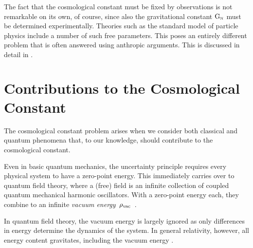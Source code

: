 The fact that the cosmological constant must be fixed by observations is not remarkable on its own, of course, since also the gravitational constant \(\mathrm{G}_\textnormal{\tiny{N}}\) must be determined experimentally. Theories such as the standard model of particle physics include a number of such free parameters. This poses an entirely different problem that is often answered using anthropic arguments. This is discussed in detail in .

\section{Contributions to the Cosmological Constant}\label{sec:cc_contrib}

The cosmological constant problem arises when we consider both classical and quantum phenomena that, to our knowledge, should contribute to the cosmological constant.

Even in basic quantum mechanics, the uncertainty principle requires every physical system to have a zero-point energy. This immediately carries over to quantum field theory, where a (free) field is an infinite collection of coupled quantum mechanical harmonic oscillators. With a zero-point energy each, they combine to an infinite \emph{vacuum energy}~\(\rho_\textnormal{vac}\)~\autocite{Martin2012}.
 
In quantum field theory, the vacuum energy is largely ignored as only differences in energy determine the dynamics of the system. In general relativity, however, all energy content gravitates, including the vacuum energy \autocite{Martin2012,Burgess2013,Padilla2015}.

